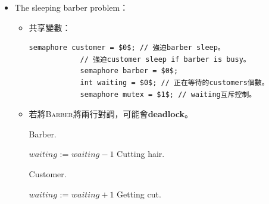 \begin{itemize}
\begin{itemize}
\begin{algorithm}[H]
\begin{algorithmic}[1]
            \end{algorithmic}
        \end{algorithm}
    \end{itemize}
    \item The sleeping barber problem：\begin{itemize}
        \item 共享變數：\begin{lstlisting}[caption={Shared variables of The sleeping barber problem.}, captionpos=b, mathescape=true]
            semaphore customer = $0$; // 強迫barber sleep。
            // 強迫customer sleep if barber is busy。
            semaphore barber = $0$; 
            int waiting = $0$; // 正在等待的customers個數。
            semaphore mutex = $1$; // waiting互斥控制。
        \end{lstlisting}
        \item 若將\textsc{Barber}將兩行對調，可能會\textbf{deadlock}。
        \begin{algorithm}[H]
            \caption{Barber.}
            \begin{algorithmic}[1]
                    \Repeat
                        \State {} 
                        \State {}
                        \State $waiting$ := $waiting - 1$
                        \State {} 
                        \State {}
                        \State Cutting hair.
                \EndFunction
            \end{algorithmic}
        \end{algorithm}
        \begin{algorithm}[H]
            \caption{Customer.}
            \begin{algorithmic}[1]
                    \Repeat
                        \State {}
                         
                            \State $waiting$ := $waiting + 1$
                            \State {} 
                            \State {}
                            \State {} 
                            \State Getting cut.
                        \Else
                            \State {}

\end{algorithmic}
\end{algorithm}
\end{itemize}
\end{itemize}
